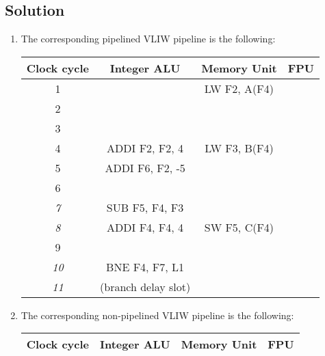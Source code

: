 \subsection*{Solution}
\begin{enumerate}
    \item The corresponding pipelined VLIW pipeline is the following: 
        \begin{table}[H]
            \centering
            \begin{tabular}{c|ccc}
            \textbf{Clock cycle} & \textbf{Integer ALU} & \textbf{Memory Unit} & \textbf{FPU} \\ \hline
            1                    &                      & LW F2, A(F4)         &              \\
            2                    &                      &                      &              \\
            3                    &                      &                      &              \\
            4                    & ADDI F2, F2, 4       & LW F3, B(F4)         &              \\
            5                    & ADDI F6, F2, -5      &                      &              \\
            6                    &                      &                      &              \\
            \textit{7}           & SUB F5, F4, F3       &                      &              \\
            \textit{8}           & ADDI F4, F4, 4       & SW F5, C(F4)         &              \\
            9                    &                      &                      &              \\
            \textit{10}          & BNE F4, F7, L1       &                      &              \\
            \textit{11}          & (branch delay slot)  &                      &             
            \end{tabular}
        \end{table}
    \item The corresponding non-pipelined VLIW pipeline is the following: 
        \begin{table}[H]
            \centering
            \begin{tabular}{c|ccc}
            \textbf{Clock cycle} & \textbf{Integer ALU} & \textbf{Memory Unit} & \textbf{FPU} \\ \hline

\end{tabular}
\end{table}
\end{enumerate}
